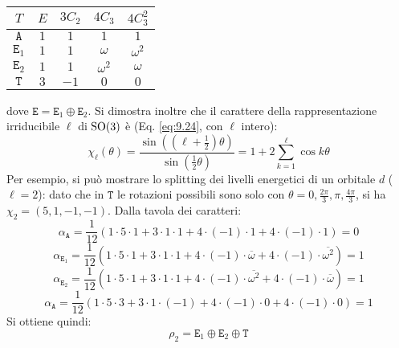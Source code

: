 \begin{table}[H]
	\centering
	\begin{tabular}{c|cccc}
		$ T $ & $ E $ & $ 3C_2 $ & $ 4C_3 $ & $ 4C_3^2 $ \\
		\hline
		$ \mathtt{A} $ & $ 1 $ & $ 1 $ & $ 1 $ & $ 1 $ \\
		$ \mathtt{E}_1 $ & $ 1 $ & $ 1 $ & $ \omega $ & $ \omega^2 $ \\
		$ \mathtt{E}_2 $ & $ 1 $ & $ 1 $ & $ \omega^2 $ & $ \omega $ \\
		$ \mathtt{T} $ & $ 3 $ & $ -1 $ & $ 0 $ & $ 0 $
	\end{tabular}
\end{table}
dove $ \mathtt{E} = \mathtt{E}_1 \oplus \mathtt{E}_2 $. Si dimostra inoltre che il carattere della rappresentazione irriducibile $ \ell $ di $ \mathrm{SO}(3) $ è (Eq. \ref{eq:9.24}, con $ \ell $ intero):
\begin{equation}
	\chi_{\ell}(\theta) = \frac{\sin \left( \left( \ell + \frac{1}{2} \right) \theta \right)}{\sin \left( \frac{1}{2} \theta \right)} = 1 + 2 \sum_{k = 1}^{\ell} \cos k\theta
	\label{eq:8.37}
\end{equation}
Per esempio, si può mostrare lo splitting dei livelli energetici di un orbitale $ d $ ($ \ell = 2 $): dato che in $ \mathtt{T} $ le rotazioni possibili sono solo con $ \theta = 0, \frac{2\pi}{3}, \pi, \frac{4\pi}{3} $, si ha $ \chi_2 = (5,1,-1,-1) $. Dalla tavola dei caratteri:
\begin{equation*}
	\alpha_{\mathtt{A}} = \frac{1}{12} (1 \cdot 5 \cdot 1 + 3 \cdot 1 \cdot 1 + 4 \cdot (-1) \cdot 1 + 4 \cdot (-1) \cdot 1) = 0
\end{equation*}
\begin{equation*}
	\alpha_{\mathtt{E}_1} = \frac{1}{12} (1 \cdot 5 \cdot 1 + 3 \cdot 1 \cdot 1 + 4 \cdot (-1) \cdot \overline{\omega} + 4 \cdot (-1) \cdot \overline{\omega^2}) = 1
\end{equation*}
\begin{equation*}
	\alpha_{\mathtt{E}_2} = \frac{1}{12} (1 \cdot 5 \cdot 1 + 3 \cdot 1 \cdot 1 + 4 \cdot (-1) \cdot \overline{\omega^2} + 4 \cdot (-1) \cdot \overline{\omega}) = 1
\end{equation*}
\begin{equation*}
	\alpha_{\mathtt{A}} = \frac{1}{12} (1 \cdot 5 \cdot 3 + 3 \cdot 1 \cdot (-1) + 4 \cdot (-1) \cdot 0 + 4 \cdot (-1) \cdot 0) = 1
\end{equation*}
Si ottiene quindi:
\begin{equation*}
	\rho_2 = \mathtt{E}_1 \oplus \mathtt{E}_2 \oplus \mathtt{T}
\end{equation*}
